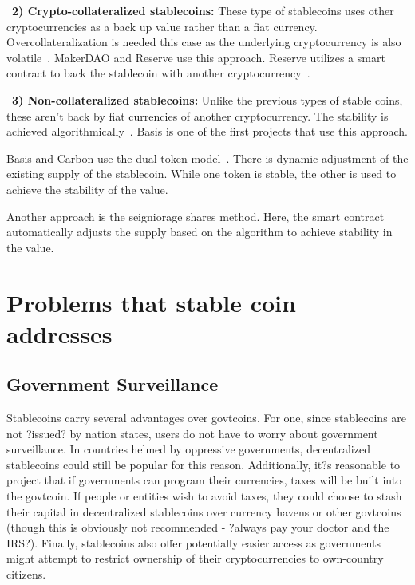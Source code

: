 
~\textbf{2) Crypto-collateralized stablecoins:} These type of stablecoins uses other cryptocurrencies as a back up value rather than a fiat currency. Overcollateralization is needed this case as the underlying cryptocurrency is also volatile~\cite{linkedin}. MakerDAO and Reserve use this approach. Reserve utilizes a smart contract to back the stablecoin with another cryptocurrency~\cite{cointelegraph}.

~\textbf{3) Non-collateralized stablecoins:} Unlike the previous types of stable coins, these aren't back by fiat currencies of another cryptocurrency. The stability is achieved algorithmically~\cite{linkedin}. Basis is one of the first projects that use this approach.

Basis and Carbon use the dual-token model~\cite{cryptoinsider}. There is dynamic adjustment of the existing supply of the stablecoin. While one token is stable, the other is used to achieve the stability of the value.


Another approach is the seigniorage shares method\cite{overview}. Here, the smart contract automatically adjusts the supply based on the algorithm to achieve stability in the value.
\section{Problems that stable coin addresses} %
\subsection{Government Surveillance}
Stablecoins carry several advantages over govtcoins. For one, since stablecoins are not ?issued? by nation states, users do not have to worry about government surveillance. In countries helmed by oppressive governments, decentralized stablecoins could still be popular for this reason. Additionally, it?s reasonable to project that if governments can program their currencies, taxes will be built into the govtcoin. If people or entities wish to avoid taxes, they could choose to stash their capital in decentralized stablecoins over currency havens or other govtcoins (though this is obviously not recommended - ?always pay your doctor and the IRS?). Finally, stablecoins also offer potentially easier access as governments might attempt to restrict ownership of their cryptocurrencies to own-country citizens.

